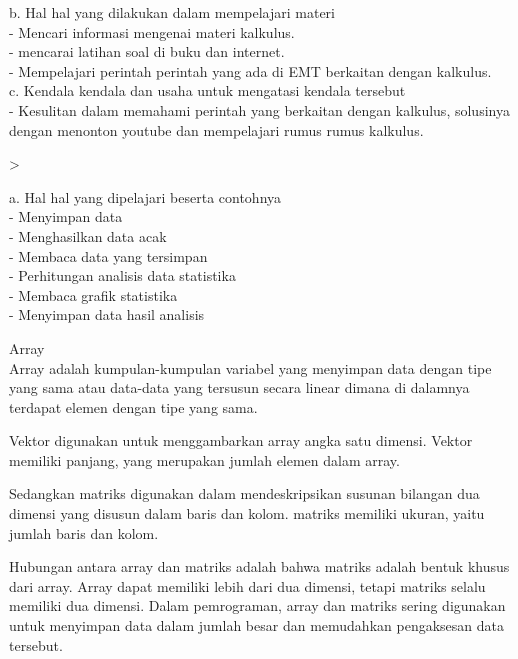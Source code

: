 \documentclass[a4paper,10pt]{article}
\begin{document}
\begin{eulernotebook}
\begin{eulercomment}
\begin{eulercomment}
\begin{eulercomment}
\begin{eulercomment}
\begin{eulercomment}
\begin{eulercomment}
\begin{eulercomment}
\begin{eulercomment}
\begin{eulercomment}
b. Hal hal yang dilakukan dalam mempelajari materi\\
- Mencari informasi mengenai materi kalkulus.\\
- mencarai latihan soal di buku dan internet.\\
- Mempelajari perintah perintah yang ada di EMT berkaitan dengan
kalkulus.\\
c. Kendala kendala dan usaha untuk mengatasi kendala tersebut\\
- Kesulitan dalam memahami perintah yang berkaitan dengan kalkulus,
solusinya dengan menonton youtube dan mempelajari rumus rumus
kalkulus.\\
\end{eulercomment}
\eulersubheading{}
\begin{eulerprompt}
> 
\end{eulerprompt}
\begin{eulercomment}
\begin{eulercomment}
\begin{eulercomment}
a. Hal hal yang dipelajari beserta contohnya\\
- Menyimpan data\\
- Menghasilkan data acak\\
- Membaca data yang tersimpan\\
- Perhitungan analisis data statistika\\
- Membaca grafik statistika\\
- Menyimpan data hasil analisis

\end{eulercomment}
\begin{eulercomment}
Array\\
Array adalah kumpulan-kumpulan variabel yang menyimpan data dengan
tipe yang sama atau data-data yang tersusun secara linear dimana di
dalamnya terdapat elemen dengan tipe yang sama.

Vektor digunakan untuk menggambarkan array angka satu dimensi. Vektor
memiliki panjang, yang merupakan jumlah elemen dalam array.

Sedangkan matriks digunakan dalam mendeskripsikan susunan bilangan dua\\
dimensi yang disusun dalam baris dan kolom. matriks memiliki ukuran,
yaitu jumlah baris dan kolom.

Hubungan antara array dan matriks adalah bahwa matriks adalah bentuk
khusus dari array. Array dapat memiliki lebih dari dua dimensi, tetapi
matriks selalu memiliki dua dimensi. Dalam pemrograman, array dan
matriks sering digunakan untuk menyimpan data dalam jumlah besar dan
memudahkan pengaksesan data tersebut.


\end{eulercomment}
\end{eulercomment}
\end{eulercomment}
\end{eulercomment}
\end{eulercomment}
\end{eulercomment}
\end{eulercomment}
\end{eulercomment}
\end{eulercomment}
\end{eulercomment}
\end{eulercomment}
\end{eulernotebook}
\end{document}
